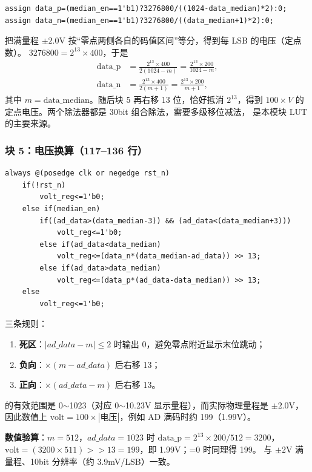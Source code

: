 \begin{lstlisting}[style=vsnip]
assign data_p=(median_en==1'b1)?3276800/((1024-data_median)*2):0;
assign data_n=(median_en==1'b1)?3276800/((data_median+1)*2):0;
\end{lstlisting}

把满量程 $\pm2.0$V 按“零点两侧各自的码值区间”等分，得到每 LSB 的电压（定点数）。
$3276800=2^{13}\times400$，于是
\begin{align}
\text{data\_p} &= \frac{2^{13}\times400}{2(1024-m)} = \frac{2^{13}\times200}{1024-m},\\
\text{data\_n} &= \frac{2^{13}\times400}{2(m+1)} = \frac{2^{13}\times200}{m+1},
\end{align}
其中 $m=\text{data\_median}$。随后块 5 再右移 13 位，恰好抵消 $2^{13}$，得到
$100\times V$ 的定点电压。两个除法器都是 30bit 组合除法，需要多级移位减法，
是本模块 LUT 的主要来源。

\subsubsection{块 5：电压换算（117--136 行）}

\begin{lstlisting}[style=vsnip]
always @(posedge clk or negedge rst_n)
    if(!rst_n)
        volt_reg<=1'b0;
    else if(median_en)
        if((ad_data>(data_median-3)) && (ad_data<(data_median+3)))
            volt_reg<=1'b0;
        else if(ad_data<data_median)
            volt_reg<=(data_n*(data_median-ad_data)) >> 13;
        else if(ad_data>data_median)
            volt_reg<=(data_p*(ad_data-data_median)) >> 13;
    else
        volt_reg<=1'b0;
\end{lstlisting}

三条规则：
\begin{enumerate}[leftmargin=2em,itemsep=2pt]
  \item \textbf{死区}：$|ad\_data-m|\le 2$ 时输出 0，避免零点附近显示末位跳动；
  \item \textbf{负向}：$\times(m-ad\_data)$ 后右移 13；
  \item \textbf{正向}：$\times(ad\_data-m)$ 后右移 13。
\end{enumerate}

 的有效范围是 0$\sim$1023（对应 0$\sim$10.23V 显示量程），而实际物理量程是
$\pm2.0$V，因此数值上 $\text{volt}=100\times|\text{电压}|$，例如 AD 满码时约 199（1.99V）。

\begin{tipbox}
\textbf{数值验算}：$m=512$，$ad\_data=1023$ 时
$\text{data\_p}=2^{13}\times200/512=3200$，
$\text{volt}=(3200\times511)>>13=199$，即 1.99V；=0 时同理得 199。
与 $\pm2$V 满量程、10bit 分辨率（约 3.9mV/LSB）一致。
\end{tipbox}

